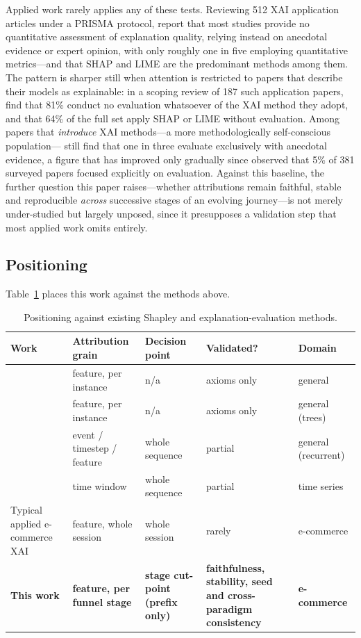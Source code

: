 \documentclass[review,3p,times,authoryear]{elsarticle}   %
\begin{document}
Applied work rarely applies any of these tests. Reviewing 512 XAI application articles
under a PRISMA protocol, \citet{saarela2024recent} report that most studies provide no quantitative
assessment of explanation quality, relying instead on anecdotal evidence or
expert opinion, with only roughly one in five employing quantitative
metrics---and that SHAP and LIME are the predominant methods among them.
The pattern is sharper still when attention is restricted to papers that
describe their models as explainable: in a scoping review of 187 such
application papers, \citet{mainali2023meant} find that 81\% conduct no
evaluation whatsoever of the XAI method they adopt, and that 64\% of the
full set apply SHAP or LIME without evaluation. Among papers that
\emph{introduce} XAI methods---a more methodologically self-conscious
population---\citet{nauta2023anecdotal} still find that one in three
evaluate exclusively with anecdotal evidence, a figure that has improved
only gradually since \citet{adadi2018peeking} observed that 5\% of 381
surveyed papers focused explicitly on evaluation. Against this baseline,
the further question this paper raises---whether attributions remain
faithful, stable and reproducible \emph{across} successive stages of an
evolving journey---is not merely under-studied but largely unposed, since
it presupposes a validation step that most applied work omits entirely.


\subsection{Positioning}

Table~\ref{tab:positioning} places this work against the methods above.

\begin{table}[t]
\centering
\caption{Positioning against existing Shapley and explanation-evaluation methods.}
\label{tab:positioning}
\small
\begin{tabular}{@{}p{3.1cm}p{2.6cm}p{2.4cm}p{3.4cm}p{2.2cm}@{}}
\toprule
\textbf{Work} & \textbf{Attribution grain} & \textbf{Decision point} &
\textbf{Validated?} & \textbf{Domain} \\
\midrule
\citet{lundberg2017unified} & feature, per instance & n/a & axioms only & general \\
\citet{lundberg2020local}   & feature, per instance & n/a & axioms only & general (trees) \\
\citet{bento2021timeshap}   & event / timestep / feature & whole sequence & partial & general (recurrent) \\
\citet{nayebi2023windowshap}& time window & whole sequence & partial & time series \\
Typical applied e-commerce XAI & feature, whole session & whole session & rarely & e-commerce \\
\textbf{This work} & \textbf{feature, per funnel stage} &
\textbf{stage cut-point (prefix only)} &
\textbf{faithfulness, stability, seed and cross-paradigm consistency} &
\textbf{e-commerce} \\
\bottomrule
\end{tabular}
\end{table}
\end{document}
